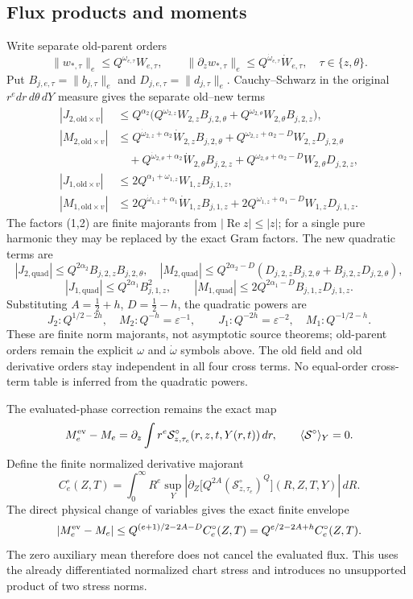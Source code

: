 \documentclass[11pt]{article}
\begin{document}
\subsection{Flux products and moments}
Write separate old-parent orders
\[
\|w_{*,\tau}\|_e\le Q^{\omega_{e,\tau}}W_{e,\tau},\qquad
\|\partial_zw_{*,\tau}\|_e\le Q^{\dot\omega_{e,\tau}}\dot W_{e,\tau},
\quad \tau\in\{z,\theta\}.
\]
Put \(B_{j,e,\tau}=\|b_{j,\tau}\|_e\) and
\(D_{j,e,\tau}=\|d_{j,\tau}\|_e\).  Cauchy--Schwarz in the original
\(r^e dr\,d\theta\,dY\) measure gives the separate old--new terms
\[
\begin{aligned}
|J_{2,\mathrm{old}\times v}|&\le Q^{\alpha_2}\bigl(Q^{\omega_{2,z}}W_{2,z}B_{j,2,\theta}
 +Q^{\omega_{2,\theta}}W_{2,\theta}B_{j,2,z}\bigr),\\
|M_{2,\mathrm{old}\times v}|&\le Q^{\dot\omega_{2,z}+\alpha_2}\dot W_{2,z}B_{j,2,\theta}
 +Q^{\omega_{2,z}+\alpha_2-D}W_{2,z}D_{j,2,\theta}\\
&\quad +Q^{\dot\omega_{2,\theta}+\alpha_2}\dot W_{2,\theta}B_{j,2,z}
 +Q^{\omega_{2,\theta}+\alpha_2-D}W_{2,\theta}D_{j,2,z},\\
|J_{1,\mathrm{old}\times v}|&\le 2Q^{\alpha_1+\omega_{1,z}}W_{1,z}B_{j,1,z},\\
|M_{1,\mathrm{old}\times v}|&\le 2Q^{\dot\omega_{1,z}+\alpha_1}\dot W_{1,z}B_{j,1,z}
 +2Q^{\omega_{1,z}+\alpha_1-D}W_{1,z}D_{j,1,z}.
\end{aligned}
\]
The factors (1,2) are finite majorants from
\(|\operatorname{Re}z|\le|z|\); for a single pure harmonic they may be
replaced by the exact Gram factors.  The new quadratic terms are
\[
|J_{2,\mathrm{quad}}|\le Q^{2\alpha_2}B_{j,2,z}B_{j,2,\theta},\quad
|M_{2,\mathrm{quad}}|\le Q^{2\alpha_2-D}(D_{j,2,z}B_{j,2,\theta}+B_{j,2,z}D_{j,2,\theta}),
\]
\[
|J_{1,\mathrm{quad}}|\le Q^{2\alpha_1}B_{j,1,z}^2,\qquad
|M_{1,\mathrm{quad}}|\le 2Q^{2\alpha_1-D}B_{j,1,z}D_{j,1,z}.
\]
Substituting \(A=\tfrac12+h\), \(D=\tfrac12-h\), the quadratic powers are
\[
J_2:Q^{1/2-2h},\quad M_2:Q^{-h}=\varepsilon^{-1},\qquad
J_1:Q^{-2h}=\varepsilon^{-2},\quad M_1:Q^{-1/2-h}.
\]
These are finite norm majorants, not asymptotic source theorems; old-parent
orders remain the explicit \(\omega\) and \(\dot\omega\) symbols above.
The old field and old derivative orders stay independent in all four cross terms. No equal-order cross-term table is inferred from the quadratic powers.

The evaluated-phase correction remains the exact map
\[
M_e^{\rm ev}-M_e=\partial_z\int r^e
 \mathcal S^\circ_{z,\tau_e}(r,z,t,Y(r,t))\,dr,\qquad
 \langle\mathcal S^\circ\rangle_Y=0 .
\]
Define the finite normalized derivative majorant
\[
C_e^\circ(Z,T)=\int_0^\infty R^e\sup_Y
 \left|\partial_Z\bigl[Q^{2A}(\mathcal S^\circ_{z,\tau_e})^Q\bigr](R,Z,T,Y)\right|\,dR .
\]
The direct physical change of variables gives the exact finite envelope
\[
|M_e^{\rm ev}-M_e|\le Q^{(e+1)/2-2A-D}C_e^\circ(Z,T)
 =Q^{e/2-2A+h}C_e^\circ(Z,T).
\]
The zero auxiliary mean therefore does not cancel the evaluated flux.  This
uses the already differentiated normalized chart stress and introduces no
unsupported product of two stress norms.
\end{document}
